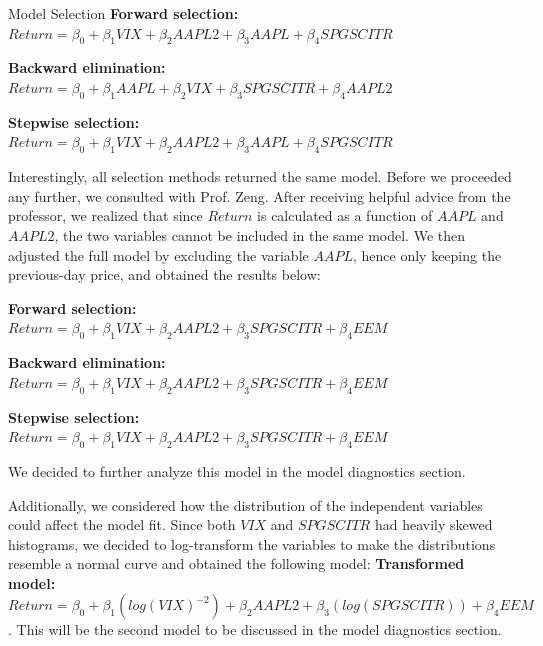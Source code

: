 \documentclass[]{article}
\begin{document}
\begin{section}{Model Selection}
\textbf{Forward selection: } $Return = \beta_0 + \beta_1VIX + \beta_2AAPL2 + \beta_3AAPL + \beta_4SPGSCITR$

\textbf{Backward elimination: } $Return = \beta_0 + \beta_1AAPL + \beta_2VIX + \beta_3SPGSCITR + \beta_4AAPL2$

\textbf{Stepwise selection: } $Return = \beta_0 + \beta_1VIX + \beta_2AAPL2 + \beta_3AAPL + \beta_4SPGSCITR$


Interestingly, all selection methods returned the same model. Before we proceeded any further, we consulted with Prof. Zeng. After receiving helpful advice from the professor, we realized that since $Return$ is calculated as a function of $AAPL$ and $AAPL2$, the two variables cannot be included in the same model. We then adjusted the full model by excluding the variable $AAPL$, hence only keeping the previous-day price, and obtained the results below:


\textbf{Forward selection: } $ Return = \beta_0 + \beta_1VIX + \beta_2AAPL2 + \beta_3SPGSCITR + \beta_4EEM$

\textbf{Backward elimination: } $ Return = \beta_0 + \beta_1VIX + \beta_2AAPL2 + \beta_3SPGSCITR + \beta_4EEM$

\textbf{Stepwise selection: } $ Return = \beta_0 + \beta_1VIX + \beta_2AAPL2 + \beta_3SPGSCITR + \beta_4EEM$

We decided to further analyze this model in the model diagnostics section.

Additionally, we considered how the distribution of the independent variables could affect the model fit. Since both $VIX$ and $SPGSCITR$ had heavily skewed histograms, we decided to log-transform the variables to make the distributions resemble a normal curve and obtained the following model:
\textbf{Transformed model: } $ Return = \beta_0 + \beta_1(log(VIX)^{-2}) + \beta_2AAPL2 + \beta_3(log(SPGSCITR)) + \beta_4EEM$. This will be the second model to be discussed in the model diagnostics section.

\end{section}
\end{document}
